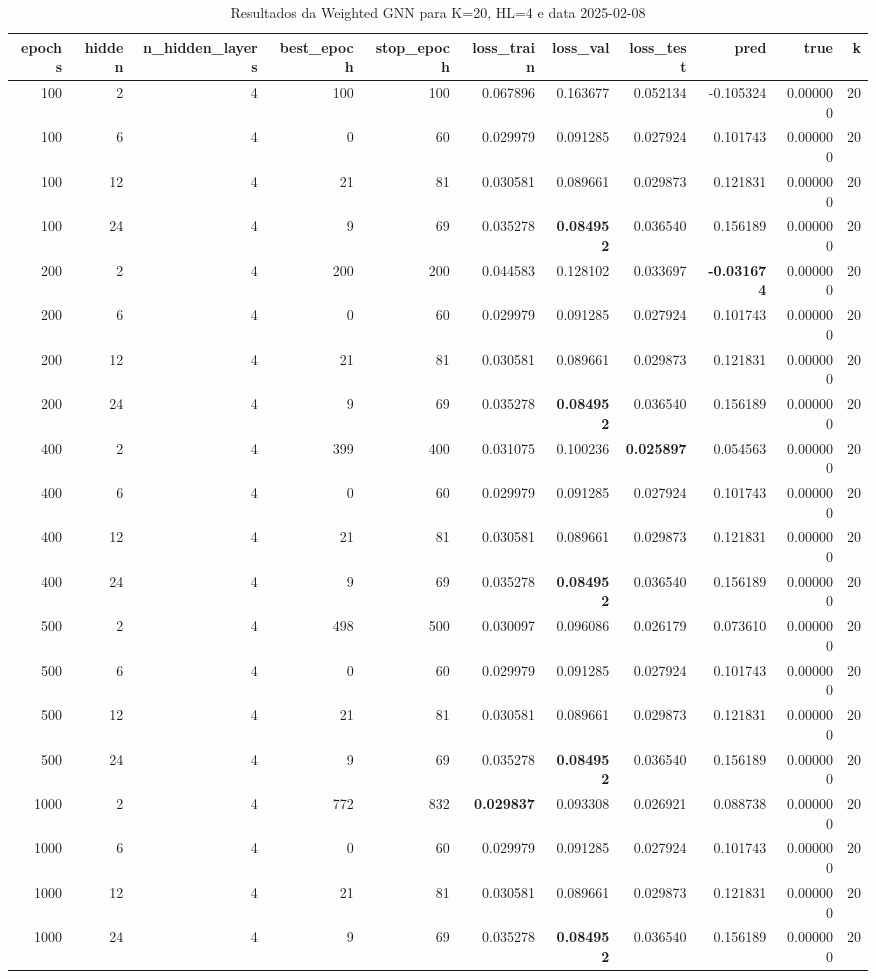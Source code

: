\begin{table}
\caption{Resultados da Weighted GNN para K=20, HL=4 e data 2025-02-08}
\label{tab:weighted_gnn_results_k20_hl4_d20250208}
\begin{tabular}{rrrrrrrrrrr}
\toprule
epochs & hidden & n\_hidden\_layers & best\_epoch & stop\_epoch & loss\_train & loss\_val & loss\_test & pred & true & k \\
\midrule
100 & 2 & 4 & 100 & 100 & 0.067896 & 0.163677 & 0.052134 & -0.105324 & 0.000000 & 20 \\
100 & 6 & 4 & 0 & 60 & 0.029979 & 0.091285 & 0.027924 & 0.101743 & 0.000000 & 20 \\
100 & 12 & 4 & 21 & 81 & 0.030581 & 0.089661 & 0.029873 & 0.121831 & 0.000000 & 20 \\
100 & 24 & 4 & 9 & 69 & 0.035278 & \textbf{0.084952} & 0.036540 & 0.156189 & 0.000000 & 20 \\
200 & 2 & 4 & 200 & 200 & 0.044583 & 0.128102 & 0.033697 & \textbf{-0.031674} & 0.000000 & 20 \\
200 & 6 & 4 & 0 & 60 & 0.029979 & 0.091285 & 0.027924 & 0.101743 & 0.000000 & 20 \\
200 & 12 & 4 & 21 & 81 & 0.030581 & 0.089661 & 0.029873 & 0.121831 & 0.000000 & 20 \\
200 & 24 & 4 & 9 & 69 & 0.035278 & \textbf{0.084952} & 0.036540 & 0.156189 & 0.000000 & 20 \\
400 & 2 & 4 & 399 & 400 & 0.031075 & 0.100236 & \textbf{0.025897} & 0.054563 & 0.000000 & 20 \\
400 & 6 & 4 & 0 & 60 & 0.029979 & 0.091285 & 0.027924 & 0.101743 & 0.000000 & 20 \\
400 & 12 & 4 & 21 & 81 & 0.030581 & 0.089661 & 0.029873 & 0.121831 & 0.000000 & 20 \\
400 & 24 & 4 & 9 & 69 & 0.035278 & \textbf{0.084952} & 0.036540 & 0.156189 & 0.000000 & 20 \\
500 & 2 & 4 & 498 & 500 & 0.030097 & 0.096086 & 0.026179 & 0.073610 & 0.000000 & 20 \\
500 & 6 & 4 & 0 & 60 & 0.029979 & 0.091285 & 0.027924 & 0.101743 & 0.000000 & 20 \\
500 & 12 & 4 & 21 & 81 & 0.030581 & 0.089661 & 0.029873 & 0.121831 & 0.000000 & 20 \\
500 & 24 & 4 & 9 & 69 & 0.035278 & \textbf{0.084952} & 0.036540 & 0.156189 & 0.000000 & 20 \\
1000 & 2 & 4 & 772 & 832 & \textbf{0.029837} & 0.093308 & 0.026921 & 0.088738 & 0.000000 & 20 \\
1000 & 6 & 4 & 0 & 60 & 0.029979 & 0.091285 & 0.027924 & 0.101743 & 0.000000 & 20 \\
1000 & 12 & 4 & 21 & 81 & 0.030581 & 0.089661 & 0.029873 & 0.121831 & 0.000000 & 20 \\
1000 & 24 & 4 & 9 & 69 & 0.035278 & \textbf{0.084952} & 0.036540 & 0.156189 & 0.000000 & 20 \\
\bottomrule
\end{tabular}
\end{table}

